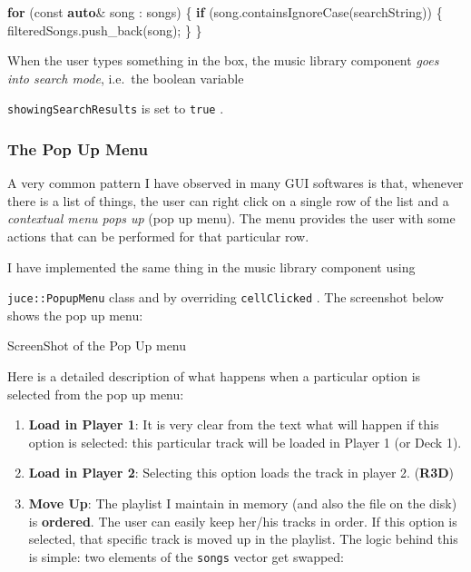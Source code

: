 \documentclass[12pt,]{article}
\newenvironment{Shaded}{}{}
\newcommand{\AttributeTok}[1]{\textcolor[rgb]{0.49,0.56,0.16}{#1}}
\newcommand{\ControlFlowTok}[1]{\textcolor[rgb]{0.00,0.44,0.13}{\textbf{#1}}}
\newcommand{\KeywordTok}[1]{\textcolor[rgb]{0.00,0.44,0.13}{\textbf{#1}}}
\newcommand{\NormalTok}[1]{#1}
\let\oldtexttt\texttt
\renewcommand{\texttt}[1]{
  \colorbox{bgcolor}{\oldtexttt{#1}}
}
\begin{document}
\begin{Shaded}
\begin{Highlighting}[]

\ControlFlowTok{for}\NormalTok{ (}\AttributeTok{const} \KeywordTok{auto}\NormalTok{& song : songs)}
\NormalTok{\{}
    \ControlFlowTok{if}\NormalTok{ (song.containsIgnoreCase(searchString)) }
\NormalTok{    \{}
\NormalTok{        filteredSongs.push_back(song);}
\NormalTok{    \}}
\NormalTok{\}}
\end{Highlighting}
\end{Shaded}

When the user types something in the box, the music library component
\emph{goes into search mode}, i.e.~the boolean variable
\texttt{showingSearchResults} is set to \texttt{true}.

\hypertarget{the-pop-up-menu}{%
\subsubsection{The Pop Up Menu}\label{the-pop-up-menu}}

A very common pattern I have observed in many GUI softwares is that,
whenever there is a list of things, the user can right click on a single
row of the list and a \emph{contextual menu pops up} (pop up menu). The
menu provides the user with some actions that can be performed for that
particular row.

I have implemented the same thing in the music library component using
\texttt{juce::PopupMenu} class and by overriding \texttt{cellClicked}.
The screenshot below shows the pop up menu:

{ScreenShot of the Pop Up menu}

Here is a detailed description of what happens when a particular option
is selected from the pop up menu:

\begin{enumerate}
\def\labelenumi{\arabic{enumi}.}
\item
  \textbf{Load in Player 1}: It is very clear from the text what will
  happen if this option is selected: this particular track will be
  loaded in Player 1 (or Deck 1).
\item
  \textbf{Load in Player 2}: Selecting this option loads the track in
  player 2. (\textbf{R3D})
\item
  \textbf{Move Up}: The playlist I maintain in memory (and also the file
  on the disk) is \textbf{ordered}. The user can easily keep her/his
  tracks in order. If this option is selected, that specific track is
  moved up in the playlist. The logic behind this is simple: two
  elements of the \texttt{songs} vector get swapped:
\end{enumerate}
\end{document}
